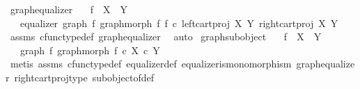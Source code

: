\begin{isabellebody}
\endisatagproof
{\isafoldproof}%
%
\isadelimproof
\isanewline
%
\endisadelimproof
\isanewline
{}\isamarkupfalse%
\ graph{\isacharunderscore}{\kern0pt}equalizer{}{\isacharcolon}{\kern0pt}\isanewline
\ \ \ {\isachardoublequoteopen}f\ {\isacharcolon}{\kern0pt}\ X\ {\isasymrightarrow}\ Y{\isachardoublequoteclose}\isanewline
\ \ \ {\isachardoublequoteopen}equalizer\ {\isacharparenleft}{\kern0pt}graph\ f{\isacharparenright}{\kern0pt}\ {\isacharparenleft}{\kern0pt}graph{\isacharunderscore}{\kern0pt}morph\ f{\isacharparenright}{\kern0pt}\ {\isacharparenleft}{\kern0pt}f\ {\isasymcirc}\isactrlsub c\ left{\isacharunderscore}{\kern0pt}cart{\isacharunderscore}{\kern0pt}proj\ X\ Y{\isacharparenright}{\kern0pt}\ {\isacharparenleft}{\kern0pt}right{\isacharunderscore}{\kern0pt}cart{\isacharunderscore}{\kern0pt}proj\ X\ Y{\isacharparenright}{\kern0pt}{\isachardoublequoteclose}\isanewline
%
\isadelimproof
\ \ %
\endisadelimproof
%
\isatagproof
{}\isamarkupfalse%
\ assms\ cfunc{\isacharunderscore}{\kern0pt}type{\isacharunderscore}{\kern0pt}def\ graph{\isacharunderscore}{\kern0pt}equalizer{}\ \isamarkupfalse%
\ auto%
\endisatagproof
{\isafoldproof}%
%
\isadelimproof
\isanewline
%
\endisadelimproof
\isanewline
{}\isamarkupfalse%
\ graph{\isacharunderscore}{\kern0pt}subobject{\isacharcolon}{\kern0pt}\isanewline
\ \ \ {\isachardoublequoteopen}f\ {\isacharcolon}{\kern0pt}\ X\ {\isasymrightarrow}\ Y{\isachardoublequoteclose}\isanewline
\ \ \ {\isachardoublequoteopen}{\isacharparenleft}{\kern0pt}graph\ f{\isacharcomma}{\kern0pt}\ graph{\isacharunderscore}{\kern0pt}morph\ f{\isacharparenright}{\kern0pt}\ {\isasymsubseteq}\isactrlsub c\ {\isacharparenleft}{\kern0pt}X\ {\isasymtimes}\isactrlsub c\ Y{\isacharparenright}{\kern0pt}{\isachardoublequoteclose}\isanewline
%
\isadelimproof
\ \ %
\endisadelimproof
%
\isatagproof
{}\isamarkupfalse%
\ {\isacharparenleft}{\kern0pt}metis\ assms\ cfunc{\isacharunderscore}{\kern0pt}type{\isacharunderscore}{\kern0pt}def\ equalizer{\isacharunderscore}{\kern0pt}def\ equalizer{\isacharunderscore}{\kern0pt}is{\isacharunderscore}{\kern0pt}monomorphism\ graph{\isacharunderscore}{\kern0pt}equalizer{}\ right{\isacharunderscore}{\kern0pt}cart{\isacharunderscore}{\kern0pt}proj{\isacharunderscore}{\kern0pt}type\ subobject{\isacharunderscore}{\kern0pt}of{\isacharunderscore}{\kern0pt}def{}{\isacharparenright}{\kern0pt}%
\endisatagproof
{\isafoldproof}%
%
\isadelimproof

\end{isabellebody}
